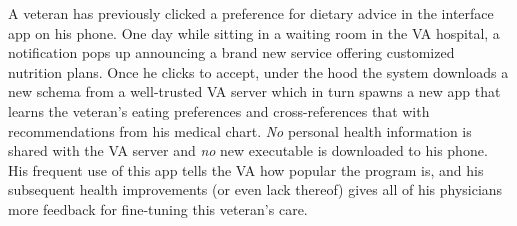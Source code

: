 A veteran has previously clicked a preference for dietary advice in the \projectName interface app on his phone.
One day while sitting in a waiting room in the VA hospital, a notification pops up announcing a brand new service offering customized nutrition plans.
Once he clicks to accept, under the hood the system downloads a new schema from a well-trusted VA server which in turn spawns a new app that learns the veteran's eating preferences and cross-references that with recommendations from his medical chart.
\emph{No} personal health information is shared with the VA server and \emph{no} new executable is downloaded to his phone.
His frequent use of this app tells the VA how popular the program is, and his subsequent health improvements (or even lack thereof) gives all of his physicians more feedback for fine-tuning this veteran's care.

